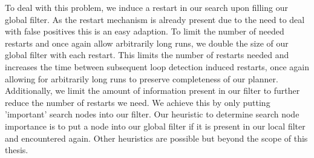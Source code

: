 To deal with this problem, we induce a restart in our search upon filling our global filter. As the restart mechanism is already present due to the need to deal with false positives this is an easy adaption. To limit the number of needed restarts and once again allow arbitrarily long runs, we double the size of our global filter with each restart. This limits the number of restarts needed and increases the time between subsequent loop detection induced restarts, once again allowing for arbitrarily long runs to preserve completeness of our planner. Additionally, we limit the amount of information present in our filter to further reduce the number of restarts we need. We achieve this by only putting 'important' search nodes into our filter. Our heuristic to determine search node importance is to put a node into our global filter if it is present in our local filter and encountered again. Other heuristics are possible but beyond the scope of this thesis.
\begin{comment}
- we need to adjust our bloom filter behavior for this case
- locally we used expanding bloom filters, this is easy
- distributed, this is difficult
- our workers may not be alive for equivalent time spans
- as a result, the number of nodes in our shared global filter may vary between nodes
- having a filter consist of differently sized sub-filters as in expanding bloom filters would complicate things here
- workers with differently filled filters may disagree about the size filter into which to put a new search node
- the implementation would get more complicated
- also, we may loose our guarantees about false positives as our different workers will independently fill their filters and then combine them, producing a new filter that may contain more search nodes than permitted

- so instead, when the global filter is full (aka false positive chance is too high), we force another restart
- for this, we also double the size of our global filter, to limit the number of restarts that happen
- and also allow arbitrarily long plans
- the root worker can control the restarts
- we know that the root is always alive for the whole duration of the job
- aka the root is guaranteed to partake in every single exchange of loop detection information
- aka the root's global filter is always at least as full as every other worker's filter
- so the root can do this independently, simplifying our implementation

- to not let the number of restarts take over, we also want to limit our global loop detection to important search nodes
- for now, we define important as encountering a search node which we've encountered before
\end{comment}

